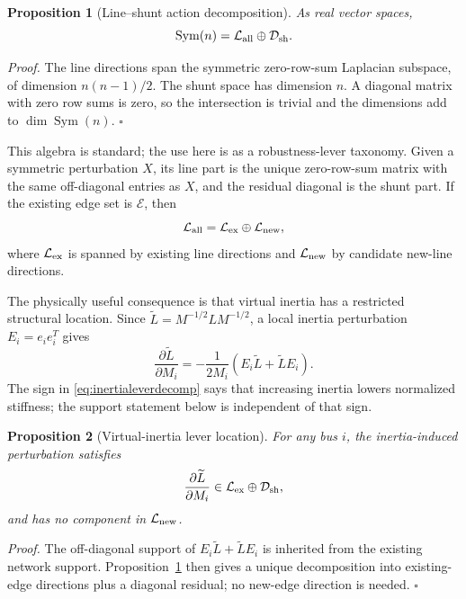\documentclass[journal]{IEEEtran}
\newtheorem{proposition}{Proposition}
\newcommand{\Lt}{\widetilde L}
\begin{document}
\begin{proposition}[Line--shunt action decomposition]
\label{prop:lineshuntdecomp}
As real vector spaces,
\begin{equation}
\operatorname{Sym}(n)=\mathcal{L}_{\rm all}\oplus\mathcal{D}_{\rm sh}.
\label{eq:lineshuntdecomp}
\end{equation}
\end{proposition}
\noindent\emph{Proof.}
The line directions span the symmetric zero-row-sum Laplacian subspace, of dimension $n(n-1)/2$. The shunt space has dimension $n$. A diagonal matrix with zero row sums is zero, so the intersection is trivial and the dimensions add to $\dim\operatorname{Sym}(n)$. \hfill$\square$

This algebra is standard; the use here is as a robustness-lever taxonomy. Given a symmetric perturbation $X$, its line part is the unique zero-row-sum matrix with the same off-diagonal entries as $X$, and the residual diagonal is the shunt part. If the existing edge set is $\mathcal{E}$, then
\begin{equation}
\mathcal{L}_{\rm all}
=\mathcal{L}_{\rm ex}\oplus\mathcal{L}_{\rm new},
\end{equation}
where $\mathcal{L}_{\rm ex}$ is spanned by existing line directions and $\mathcal{L}_{\rm new}$ by candidate new-line directions.

The physically useful consequence is that virtual inertia has a restricted structural location. Since $\Lt=M^{-1/2}LM^{-1/2}$, a local inertia perturbation $E_i=e_ie_i^T$ gives
\begin{equation}
\frac{\partial \Lt}{\partial M_i}
=-\frac{1}{2M_i}(E_i\Lt+\Lt E_i).
\label{eq:inertialeverdecomp}
\end{equation}
The sign in \eqref{eq:inertialeverdecomp} says that increasing inertia lowers normalized stiffness; the support statement below is independent of that sign.

\begin{proposition}[Virtual-inertia lever location]
\label{prop:inertialocation}
For any bus $i$, the inertia-induced perturbation satisfies
\begin{equation}
\frac{\partial \Lt}{\partial M_i}\in
\mathcal{L}_{\rm ex}\oplus\mathcal{D}_{\rm sh},
\label{eq:inertiaexistingshunt}
\end{equation}
and has no component in $\mathcal{L}_{\rm new}$.
\end{proposition}
\noindent\emph{Proof.}
The off-diagonal support of $E_i\Lt+\Lt E_i$ is inherited from the existing network support. Proposition~\ref{prop:lineshuntdecomp} then gives a unique decomposition into existing-edge directions plus a diagonal residual; no new-edge direction is needed. \hfill$\square$
\end{document}
